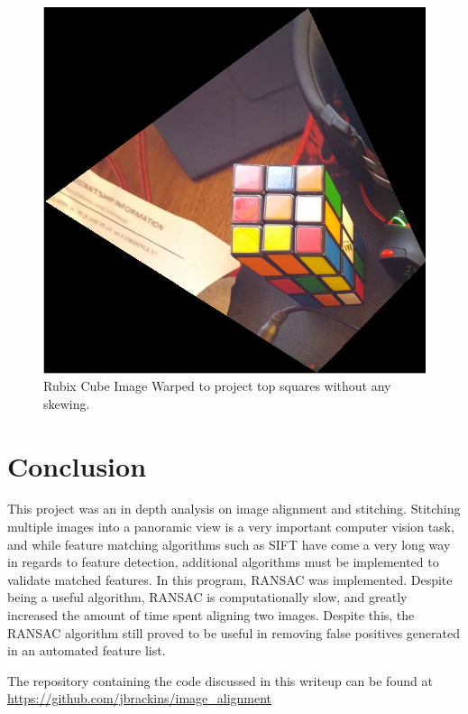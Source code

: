 \documentclass[12pt,journal,compsoc]{IEEEtran}
\begin{document}
\begin{figure}[h]
	\centering
		  \centering
		  \includegraphics[width=1\linewidth]{img/rubix2}
		  \caption{Rubix Cube Image Warped to project top squares without any skewing.}
		  \label{fig:rubix2}
\end{figure}

\clearpage

\section{Conclusion}
This project was an in depth analysis on image alignment and stitching. Stitching multiple images into a panoramic view is a very important computer vision task, and while feature matching algorithms such as SIFT have come a very long way in regards to feature detection, additional algorithms must be implemented to validate matched features. In this program, RANSAC was implemented. Despite being a useful algorithm, RANSAC is computationally slow, and greatly increased the amount of time spent aligning two images. Despite this, the RANSAC algorithm still proved to be useful in removing false positives generated in an automated feature list.

The repository containing the code discussed in this writeup can be found at {\url{https://github.com/jbrackins/image_alignment}}
\end{document}

